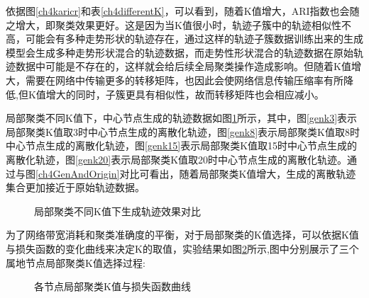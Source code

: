 依据图\ref{ch4karicr}和表\ref{ch4differentK}，可以看到，随着K值增大，ARI指数也会随之增大，即聚类效果更好。这是因为当K值很小时，轨迹子簇中的轨迹相似性不高，可能会有多种走势形状的轨迹存在，通过这样的轨迹子簇数据训练出来的生成模型会生成多种走势形状混合的轨迹数据，而走势性形状混合的轨迹数据在原始轨迹数据中可能是不存在的，这样就会给后续全局聚类操作造成影响。但随着K值增大，需要在网络中传输更多的转移矩阵，也因此会使网络信息传输压缩率有所降低,但K值增大的同时，子簇更具有相似性，故而转移矩阵也会相应减小。

局部聚类不同K值下，中心节点生成的轨迹数据如图\ref{genTrForDifferentK}所示，其中，图\ref{genk3}表示局部聚类K值取3时中心节点生成的离散化轨迹，图\ref{genk8}表示局部聚类K值取8时中心节点生成的离散化轨迹，图\ref{genk15}表示局部聚类K值取15时中心节点生成的离散化轨迹，图\ref{genk20}表示局部聚类K值取20时中心节点生成的离散化轨迹。通过与图\ref{ch4GenAndOrigin}对比可看出，随着局部聚类K值增大，生成的离散轨迹集合更加接近于原始轨迹数据。
\begin{figure}[H]
\caption{局部聚类不同K值下生成轨迹效果对比}
\label{genTrForDifferentK}
\end{figure}

为了网络带宽消耗和聚类准确度的平衡，对于局部聚类的K值选择，可以依据K值与损失函数的变化曲线来决定K的取值，实验结果如图\ref{ch4nodeck}所示,图中分别展示了三个属地节点局部聚类K值选择过程:
\begin{figure}[H]
\caption{各节点局部聚类K值与损失函数曲线}
\label{ch4nodeck}
\end{figure}




